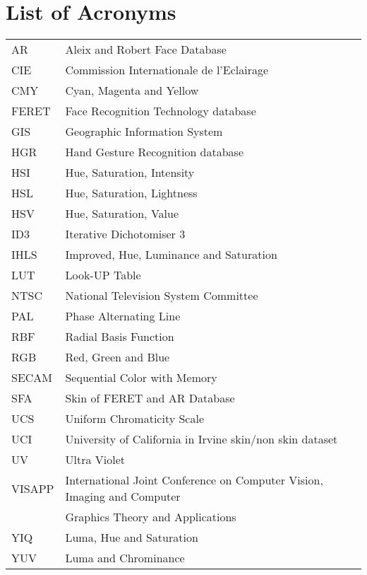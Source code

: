 \documentclass[11pt,twoside,a4paper]{book}
\theoremstyle{plain}
\theoremstyle{definition}
\begin{document}
\chapter{List of Acronyms}
\begin{tabular}{ll}
    AR          & Aleix and Robert Face Database\\
    CIE         & Commission Internationale de l'Eclairage\\
    CMY         & Cyan, Magenta and Yellow\\
    FERET       & Face Recognition Technology database\\
    GIS         & Geographic Information System\\
    HGR         & Hand Gesture Recognition database\\
    HSI         & Hue, Saturation, Intensity\\
    HSL         & Hue, Saturation, Lightness\\
    HSV         & Hue, Saturation, Value\\
    ID3         & Iterative Dichotomiser 3\\
    IHLS        & Improved, Hue, Luminance and Saturation\\
    LUT         & Look-UP Table\\
    NTSC        & National Television System Committee\\
    PAL         & Phase Alternating Line\\
    RBF         & Radial Basis Function\\
    RGB         & Red, Green and Blue\\
    SECAM       & Sequential Color with Memory\\
    SFA         & Skin of FERET and AR Database\\
    UCS         & Uniform Chromaticity Scale\\
    UCI         & University of California in Irvine skin/non skin dataset\\
    UV          & Ultra Violet\\
    VISAPP      & International Joint Conference on Computer Vision, Imaging and Computer\\
                & Graphics Theory and Applications\\
    YIQ         & Luma, Hue and Saturation\\
    YUV         & Luma and Chrominance\\
\end{tabular}
\end{document}
